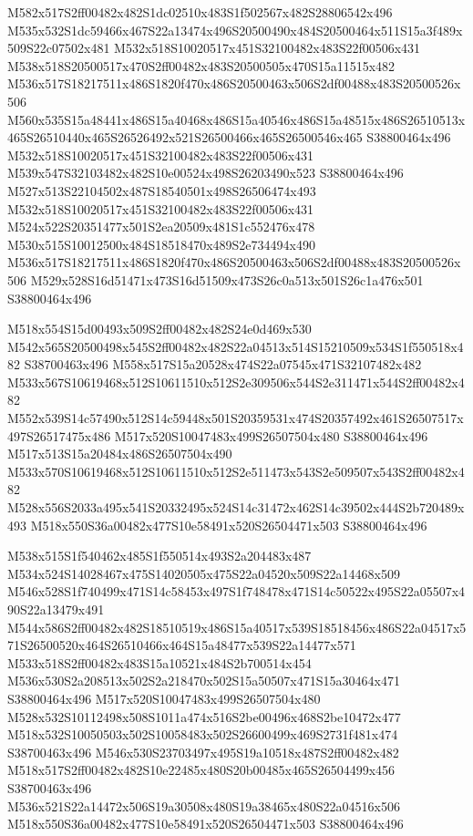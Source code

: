 \documentclass{article}
\begin{document}
\begin{multicols}{2}
M582x517S2ff00482x482S1dc02510x483S1f502567x482S28806542x496 M535x532S1dc59466x467S22a13474x496S20500490x484S20500464x511S15a3f489x509S22c07502x481 M532x518S10020517x451S32100482x483S22f00506x431 M538x518S20500517x470S2ff00482x483S20500505x470S15a11515x482 M536x517S18217511x486S1820f470x486S20500463x506S2df00488x483S20500526x506 M560x535S15a48441x486S15a40468x486S15a40546x486S15a48515x486S26510513x465S26510440x465S26526492x521S26500466x465S26500546x465 S38800464x496 M532x518S10020517x451S32100482x483S22f00506x431 M539x547S32103482x482S10e00524x498S26203490x523 S38800464x496 M527x513S22104502x487S18540501x498S26506474x493 M532x518S10020517x451S32100482x483S22f00506x431 M524x522S20351477x501S2ea20509x481S1c552476x478 M530x515S10012500x484S18518470x489S2e734494x490 M536x517S18217511x486S1820f470x486S20500463x506S2df00488x483S20500526x506 M529x528S16d51471x473S16d51509x473S26c0a513x501S26c1a476x501 S38800464x496

M518x554S15d00493x509S2ff00482x482S24e0d469x530 M542x565S20500498x545S2ff00482x482S22a04513x514S15210509x534S1f550518x482 S38700463x496 M558x517S15a20528x474S22a07545x471S32107482x482 M533x567S10619468x512S10611510x512S2e309506x544S2e311471x544S2ff00482x482 M552x539S14c57490x512S14c59448x501S20359531x474S20357492x461S26507517x497S26517475x486 M517x520S10047483x499S26507504x480 S38800464x496 M517x513S15a20484x486S26507504x490 M533x570S10619468x512S10611510x512S2e511473x543S2e509507x543S2ff00482x482 M528x556S2033a495x541S20332495x524S14c31472x462S14c39502x444S2b720489x493 M518x550S36a00482x477S10e58491x520S26504471x503 S38800464x496

M538x515S1f540462x485S1f550514x493S2a204483x487 M534x524S14028467x475S14020505x475S22a04520x509S22a14468x509 M546x528S1f740499x471S14c58453x497S1f748478x471S14c50522x495S22a05507x490S22a13479x491 M544x586S2ff00482x482S18510519x486S15a40517x539S18518456x486S22a04517x571S26500520x464S26510466x464S15a48477x539S22a14477x571 M533x518S2ff00482x483S15a10521x484S2b700514x454 M536x530S2a208513x502S2a218470x502S15a50507x471S15a30464x471 S38800464x496 M517x520S10047483x499S26507504x480 M528x532S10112498x508S1011a474x516S2be00496x468S2be10472x477 M518x532S10050503x502S10058483x502S26600499x469S2731f481x474 S38700463x496 M546x530S23703497x495S19a10518x487S2ff00482x482 M518x517S2ff00482x482S10e22485x480S20b00485x465S26504499x456 S38700463x496 M536x521S22a14472x506S19a30508x480S19a38465x480S22a04516x506 M518x550S36a00482x477S10e58491x520S26504471x503 S38800464x496


\end{multicols}
\end{document}
